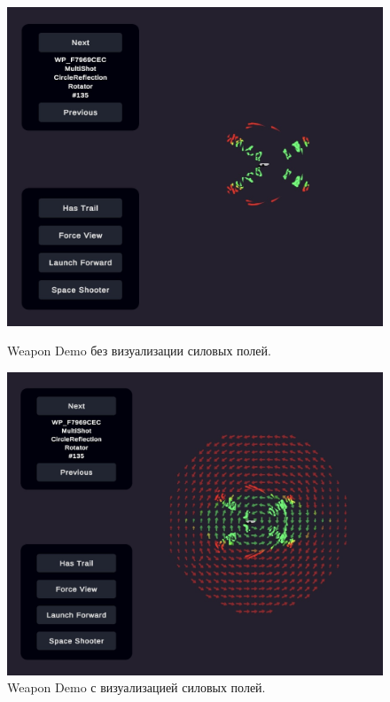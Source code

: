 \begin{figure}[ht]
    \begin{center}
        \begin{minipage}[b]{0.38\textwidth}
            \includegraphics[width=\textwidth]{images/WeaponDemo1}
            \caption{
                \label{WeaponDemo1}
                Weapon Demo без визуализации силовых полей.}
        \end{minipage}
        \hspace{30pt}
        \begin{minipage}[b]{0.4\textwidth}
            \includegraphics[width=\textwidth]{images/WeaponDemo2}
            \caption{
                \label{WeaponDemo2}
                Weapon Demo с визуализацией силовых полей.}
        \end{minipage}

    \end{center}
\end{figure}


